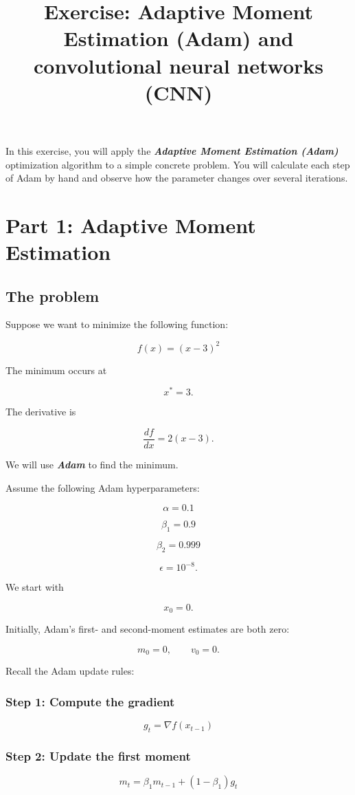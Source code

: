 \documentclass{course_sheet}
\begin{document}
\title{Exercise: Adaptive Moment Estimation (Adam) and convolutional neural networks (CNN)}
\author{}
\date{}
\maketitle
In this exercise, you will apply the \textbf{\textit{Adaptive Moment Estimation (Adam)}} optimization algorithm to a simple concrete problem. You will calculate each step of Adam by hand and observe how the parameter changes over several iterations.
\section*{Part 1: Adaptive Moment Estimation}

\subsection*{The problem}
Suppose we want to minimize the following function:

\[
f(x) = (x-3)^2
\]

The minimum occurs at

\[
x^* = 3.
\]

The derivative is

\[
\frac{df}{dx} = 2(x-3).
\]

We will use \textbf{\textit{Adam}} to find the minimum.

Assume the following Adam hyperparameters:

\[
\alpha = 0.1
\]

\[
\beta_1 = 0.9
\]

\[
\beta_2 = 0.999
\]

\[
\epsilon = 10^{-8}.
\]

We start with

\[
x_0 = 0.
\]

Initially, Adam's first- and second-moment estimates are both zero:

\[
m_0 = 0,
\qquad
v_0 = 0.
\]

Recall the Adam update rules:

\subsubsection*{Step 1: Compute the gradient}
\[
g_t = \nabla f(x_{t-1})
\]

\subsubsection*{Step 2: Update the first moment}
\[
m_t = \beta_1m_{t-1} + (1-\beta_1)g_t
\]
\end{document}
